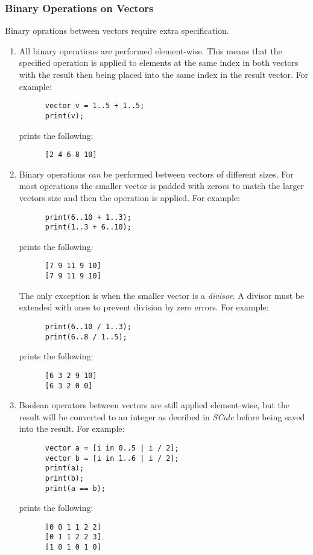 \documentclass{article}
\begin{document}
\subsubsection{Binary Operations on Vectors}
Binary oprations between vectors require extra specification.
\begin{enumerate}
  \item
    All binary operations are performed element-wise. This means that the specified operation is
    applied to elements at the same index in both vectors with the result then being placed into the
    same index in the result vector. For example:
    \begin{lstlisting}
      vector v = 1..5 + 1..5;
      print(v);
    \end{lstlisting}

    prints the following:
    \begin{lstlisting}
      [2 4 6 8 10]
    \end{lstlisting}
  \item
    Binary operations \textit{can} be performed between vectors of different sizes. For most
    operations the smaller vector is padded with zeroes to match the larger vectors size and then
    the operation is applied.
    For example:
    \begin{lstlisting}
      print(6..10 + 1..3);
      print(1..3 + 6..10);
    \end{lstlisting}

    prints the following:
    \begin{lstlisting}
      [7 9 11 9 10]
      [7 9 11 9 10]
    \end{lstlisting}

    The only exception is when the smaller vector is a \textit{divisor}. A divisor must be extended
    with ones to prevent division by zero errors. For example:
    \begin{lstlisting}
      print(6..10 / 1..3);
      print(6..8 / 1..5);
    \end{lstlisting}

    prints the following:
    \begin{lstlisting}
      [6 3 2 9 10]
      [6 3 2 0 0]
    \end{lstlisting}
  \item
    Boolean operators between vectors are still applied element-wise, but the result will be
    converted to an integer as decribed in \textit{SCalc} before being saved into the result. For
    example:
    \begin{lstlisting}
      vector a = [i in 0..5 | i / 2];
      vector b = [i in 1..6 | i / 2];
      print(a);
      print(b);
      print(a == b);
    \end{lstlisting}

    prints the following:
    \begin{lstlisting}
      [0 0 1 1 2 2]
      [0 1 1 2 2 3]
      [1 0 1 0 1 0]
    \end{lstlisting}
\end{enumerate}
\end{document}
